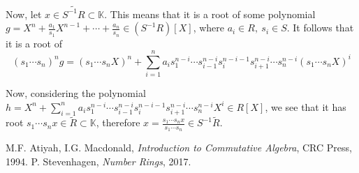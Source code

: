 \documentclass{article}
\newcommand{\numberset}{\mathbb}
\newcommand{\K}{\numberset{K}}
\begin{document}
Now, let $x\in\widetilde{S^{-1}R}\subset\K$. This means that it is a root of some polynomial $g=X^n+\frac{a_1}{s_1}X^{n-1}+\cdots+\frac{a_n}{s_n}\in (S^{-1}R)[X]$, where $a_i\in R,\ s_i\in S$. It follows that it is a root of$$(s_1\cdots s_n)^ng=(s_1\cdots s_nX)^n+\sum_{i=1}^n a_is_1^{n-i}\cdots s_{i-1}^{n-i}s_i^{n-i-1}s_{i+1}^{n-i}\cdots s_n^{n-i} (s_1\cdots s_nX)^i$$

Now, considering the polynomial $h=X^n+\sum_{i=1}^n a_is_1^{n-i}\cdots s_{i-1}^{n-i}s_i^{n-i-1}s_{i+1}^{n-i}\cdots s_n^{n-i} X^i\in R[X]$, we see that it has root $s_1\cdots s_nx\in\tilde{R}\subset\K$, therefore $x=\frac{s_1\cdots s_nx}{s_1\cdots s_n}\in S^{-1}\tilde{R}$.

\begin{thebibliography}{9}
		M.F. Atiyah, I.G. Macdonald,
		\textit{Introduction to Commutative Algebra},
		CRC Press,
		1994.
		P. Stevenhagen,
		\textit{Number Rings},
		2017.
\end{thebibliography}
\end{document}

